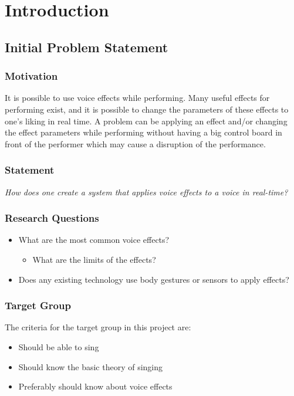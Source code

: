 \chapter{Introduction}\label{ch:Intro}

\section{Initial Problem Statement}

\subsection{Motivation}

It is possible to use voice effects while performing. Many useful effects for performing exist, and it is possible to change the parameters of these effects to one's liking in real time. 
A problem can be applying an effect and/or changing the effect parameters while performing without having a big control board in front of the performer which may cause a disruption of the performance.

\subsection{Statement}

\textit{How does one create a system that applies voice effects to a voice in real-time?}


\subsection{Research Questions}\label{sub:ResearchQ}

\begin{itemize}
	\item What are the most common voice effects?
	\begin{itemize}
		\item What are the limits of the effects? 
	\end{itemize}
	\item Does any existing technology use body gestures or sensors to apply effects?
\end{itemize}

\subsection{Target Group}
The criteria for the target group in this project are:
\begin{itemize}
	\item Should be able to sing 
	\item Should know the basic theory of singing
	\item Preferably should know about voice effects
\end{itemize}

